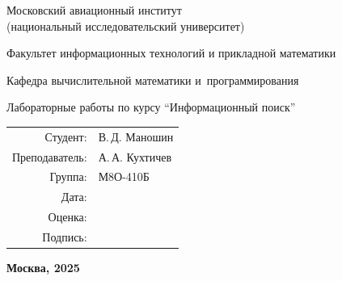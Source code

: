 \begin{titlepage}
\begin{center}
\bfseries

{\Large Московский авиационный институт\\ (национальный исследовательский университет)}

\vspace{48pt}

{\large Факультет информационных технологий и прикладной математики}

\vspace{36pt}

{\large Кафедра вычислительной математики и~программирования}

\vspace{48pt}

Лабораторные работы по курсу \enquote{Информационный поиск}

\end{center}

\vspace{72pt}

\begin{flushright}
\begin{tabular}{rl}
Студент: & В.\,Д. Маношин \\
Преподаватель: & А.\,А. Кухтичев \\
Группа: & М8О-410Б \\
Дата: & \\
Оценка: & \\
Подпись: & \\
\end{tabular}
\end{flushright}

\vfill

\begin{center}
\bfseries
Москва, 2025
\end{center}
\end{titlepage}

\pagebreak
